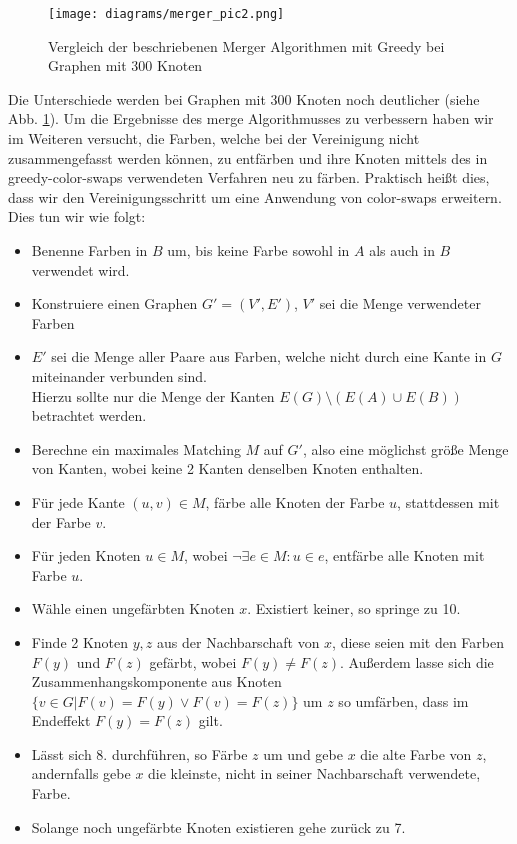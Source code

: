 \documentclass[11pt]{article}
\begin{document}
\begin{figure}
  \texttt{[image: diagrams/merger\_pic2.png]}
  \caption{Vergleich der beschriebenen Merger Algorithmen mit Greedy bei Graphen mit 300 Knoten}
  \label{fig:merge2}
\end{figure}

Die Unterschiede werden bei Graphen mit 300 Knoten noch deutlicher (siehe Abb. \ref{fig:merge2}).
Um die Ergebnisse des merge Algorithmusses zu verbessern haben wir im Weiteren versucht, 
die Farben, welche bei der Vereinigung nicht zusammengefasst werden können,
zu entfärben und ihre Knoten mittels des in greedy-color-swaps verwendeten Verfahren neu zu färben.
Praktisch heißt dies, dass wir den Vereinigungsschritt um eine Anwendung von color-swaps erweitern.
Dies tun wir wie folgt:

\begin{itemize}
\item[1.] Benenne Farben in $B$ um, bis keine Farbe sowohl in $A$ als auch in $B$ verwendet wird.
\item[2.] Konstruiere einen Graphen $G'=(V',E')$, $V'$ sei die Menge verwendeter Farben
\item[3.] $E'$ sei die Menge aller Paare aus Farben, welche nicht durch eine Kante in $G$ miteinander verbunden sind. \\Hierzu sollte nur die Menge der Kanten $E(G)\setminus (E(A)\cup E(B))$ betrachtet werden.
\item[4.] Berechne ein maximales Matching $M$ auf $G'$, also eine möglichst größe Menge von Kanten, wobei keine 2 Kanten denselben Knoten enthalten.
\item[5.] Für jede Kante $(u,v)\in M$, färbe alle Knoten der Farbe $u$, stattdessen mit der Farbe $v$.
\item[6.] Für jeden Knoten $u\in M$, wobei $\neg \exists e\in M : u\in e$, entfärbe alle Knoten mit Farbe $u$.
\item[7.] Wähle einen ungefärbten Knoten $x$. Existiert keiner, so springe zu 10.
\item[8.] Finde 2 Knoten $y,z$ aus der Nachbarschaft von $x$, diese seien mit den Farben $F(y)$ und $F(z)$ gefärbt, wobei $F(y)\neq F(z)$.
Außerdem lasse sich die Zusammenhangskomponente aus Knoten $\{v\in G | F(v)=F(y) \lor F(v)=F(z)\}$ um $z$ so umfärben, dass im Endeffekt $F(y)=F(z)$ gilt.
\item[9.] Lässt sich 8. durchführen, so Färbe $z$ um und gebe $x$ die alte Farbe von $z$, andernfalls gebe $x$ die kleinste, nicht in seiner Nachbarschaft verwendete, Farbe.
\item[10.] Solange noch ungefärbte Knoten existieren gehe zurück zu 7.
\end{itemize}
\end{document}
